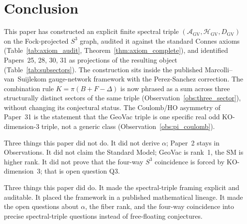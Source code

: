 \documentclass[11pt]{article}
\begin{document}
\section{Conclusion}
\label{sec:conclusion}

This paper has constructed an explicit finite spectral triple
$(\mathcal{A}_{\mathrm{GV}}, \mathcal{H}_{\mathrm{GV}},
D_{\mathrm{GV}})$ on the Fock-projected $S^3$ graph, audited it
against the standard Connes axioms (Table~\ref{tab:axiom_audit},
Theorem~\ref{thm:axiom_complete}), and identified Papers~25, 28, 30,
31 as projections of the resulting object
(Table~\ref{tab:subsectors}).  The construction sits inside the
published Marcolli--van~Suijlekom gauge-network framework with the
Perez-Sanchez correction.  The combination rule
$K = \pi(B + F - \Delta)$ is now phrased as a sum across three
structurally distinct sectors of the same triple
(Observation~\ref{obs:three_sector}), without changing its
conjectural status.  The Coulomb/HO asymmetry of Paper~31 is the
statement that the GeoVac triple is one specific real odd
$\mathrm{KO}$-dimension-3 triple, not a generic class
(Observation~\ref{obs:pi_coulomb}).

Three things this paper did not do.  It did not derive $\alpha$;
Paper~2 stays in Observations.  It did not claim the Standard Model;
GeoVac is rank~1, the SM is higher rank.  It did not prove that the
four-way $S^3$ coincidence is forced by $\mathrm{KO}$-dimension~3;
that is open question Q3.

Three things this paper did do.  It made the spectral-triple framing
explicit and auditable.  It placed the framework in a published
mathematical lineage.  It made the open questions about $\alpha$, the
fiber rank, and the four-way coincidence into precise spectral-triple
questions instead of free-floating conjectures.
\end{document}
